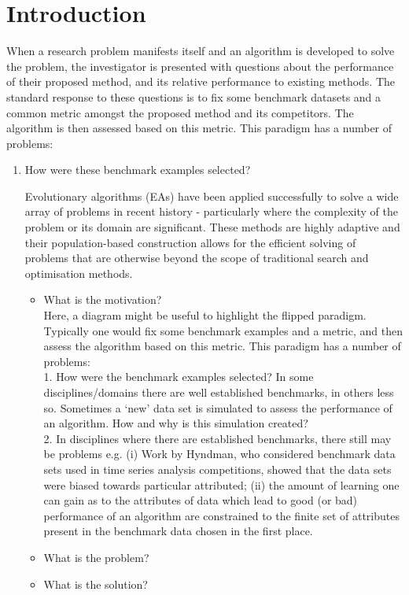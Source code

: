 \section{Introduction}\label{section:introduction}

When a research problem manifests itself and an algorithm is developed to solve
the problem, the investigator is presented with questions about the performance
of their proposed method, and its relative performance to existing methods. The
standard response to these questions is to fix some benchmark datasets and a
common metric amongst the proposed method and its competitors. The algorithm is
then assessed based on this metric. This paradigm has a number of problems:

\begin{enumerate}
    \item How were these benchmark examples selected?

Evolutionary algorithms (EAs) have been applied successfully to solve a wide
array of problems in recent history \-- particularly where the complexity of the
problem or its domain are significant. These methods are highly adaptive and
their population-based construction allows for the efficient solving of problems
that are otherwise beyond the scope of traditional search and optimisation
methods.


\begin{itemize}
    \item What is the motivation?\\ Here, a diagram might be useful to highlight
        the flipped paradigm. Typically one would fix some benchmark examples
        and a metric, and then assess the algorithm based on this metric. This
        paradigm has a number of problems:\\ 1. How were the benchmark examples
        selected? In some disciplines/domains there are well established
        benchmarks, in others less so. Sometimes a `new' data set is simulated
        to assess the performance of an algorithm. How and why is this
        simulation created?\\ 2. In disciplines where there are established
        benchmarks, there still may be problems e.g. (i) Work by Hyndman, who
        considered benchmark data sets used in time series analysis
        competitions, showed that the data sets were biased towards particular
        attributed; (ii) the amount of learning one can gain as to the
        attributes of data which lead to good (or bad) performance of an
        algorithm are constrained to the finite set of attributes present in the
        benchmark data chosen in the first place.
    \item What is the problem?
    \item What is the solution?
\end{itemize}


\end{enumerate}
